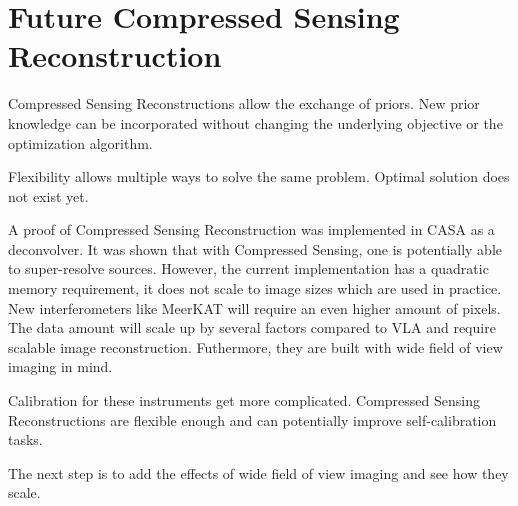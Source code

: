 \section{Future Compressed Sensing Reconstruction}
Compressed Sensing Reconstructions allow the exchange of priors. New prior knowledge can be incorporated without changing the underlying objective or the optimization algorithm.

Flexibility allows multiple ways to solve the same problem. Optimal solution does not exist yet. 

A proof of Compressed Sensing Reconstruction was implemented in CASA as a deconvolver. It was shown that with Compressed Sensing, one is potentially able to super-resolve sources. However, the current implementation has a quadratic memory requirement, it does not scale to image sizes which are used in practice. New interferometers like MeerKAT will require an even higher amount of pixels. The data amount will scale up by several factors compared to VLA and require scalable image reconstruction. Futhermore, they are built with wide field of view imaging in mind. 

Calibration for these instruments get more complicated. Compressed Sensing Reconstructions are flexible enough and can potentially improve self-calibration tasks.

The next step is to add the effects of wide field of view imaging and see how they scale.

